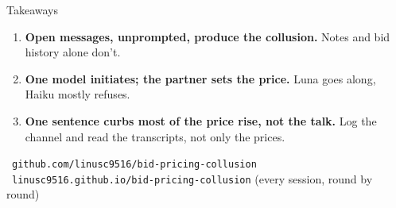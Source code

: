 \documentclass[aspectratio=169,11pt]{beamer}
\begin{document}
\begin{frame}{Takeaways}
  \begin{enumerate}
    \item \textbf{Open messages, unprompted, produce the collusion.} Notes and bid history alone don't.
    \item \textbf{One model initiates; the partner sets the price.} Luna goes along, Haiku mostly refuses.
    \item \textbf{One sentence curbs most of the price rise, not the talk.} Log the channel and read the transcripts, not only the prices.
  \end{enumerate}
  \vspace{1.2em}
  {\small\faGithub\ \texttt{github.com/linusc9516/bid-pricing-collusion}\\[2pt]
  \faGlobe\ \texttt{linusc9516.github.io/bid-pricing-collusion} \textcolor{muted}{(every session, round by round)}}
\end{frame}
\end{document}
